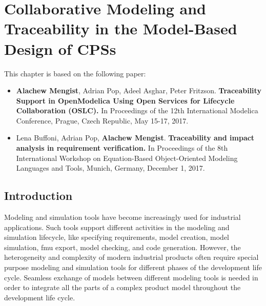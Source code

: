 

\chapter{Collaborative Modeling and Traceability in the Model-Based Design of CPSs}
\label{cha:traceability}


This chapter is based on the following paper:

\begin{itemize}
	
	\item  \textbf{Alachew Mengist}, Adrian Pop, Adeel Asghar, Peter Fritzson. \textbf{Traceability Support in OpenModelica Using Open Services for Lifecycle Collaboration (OSLC).} In Proceedings of the 12th International Modelica Conference, Prague, Czech Republic, May 15-17, 2017. 
	
	\item  Lena Buffoni, Adrian Pop, \textbf{Alachew Mengist}. \textbf{Traceability and impact analysis in requirement verification.} In Proceedings of the 8th International Workshop on Equation-Based Object-Oriented Modeling Languages and Tools, Munich, Germany, December 1, 2017. 
	
\end{itemize}

\section{Introduction}
\label{sec:tracaebilityintroduction}


Modeling and simulation tools have become increasingly used for industrial applications. Such tools support different 
activities in the modeling and simulation lifecycle, like specifying requirements, model creation, model simulation, \acrshort{fmu} 
export, model checking, and code generation. However, the heterogeneity and complexity of modern industrial products often require special purpose modeling and simulation tools for different phases of the development life cycle. Seamless exchange of models between different modeling tools
is needed in order to integrate all the parts of a complex product model throughout the development life cycle. 

